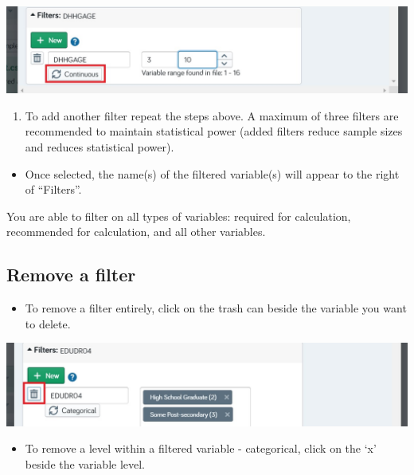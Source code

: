 \documentclass[]{book}
\providecommand{\tightlist}{%
  \setlength{\itemsep}{0pt}\setlength{\parskip}{0pt}}
\begin{document}
\begin{center}\includegraphics{Images/FilterCont} \end{center}

\begin{enumerate}
\def\labelenumi{\arabic{enumi}.}
\setcounter{enumi}{3}
\tightlist
\item
  To add another filter repeat the steps above. A maximum of three
  filters are recommended to maintain statistical power (added filters
  reduce sample sizes and reduces statistical power).
\end{enumerate}

\begin{itemize}
\tightlist
\item
  Once selected, the name(s) of the filtered variable(s) will appear to
  the right of ``Filters''.
\end{itemize}

You are able to filter on all types of variables: required for
calculation, recommended for calculation, and all other variables.

\subsection{Remove a filter}\label{remove-a-filter}

\begin{itemize}
\tightlist
\item
  To remove a filter entirely, click on the trash can beside the
  variable you want to delete.
\end{itemize}

\begin{center}\includegraphics{Images/FilterRemove1} \end{center}

\begin{itemize}
\tightlist
\item
  To remove a level within a filtered variable - categorical, click on
  the `x' beside the variable level.
\end{itemize}
\end{document}

